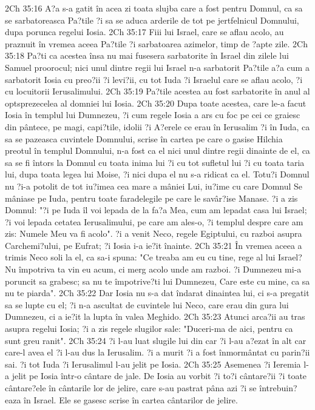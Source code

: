 2Ch 35:16  A?a s-a gatit în acea zi toata slujba care a fost pentru Domnul, ca sa se sarbatoreasca Pa?tile ?i sa se aduca arderile de tot pe jertfelnicul Domnului, dupa porunca regelui Iosia.
2Ch 35:17  Fiii lui Israel, care se aflau acolo, au praznuit în vremea aceea Pa?tile ?i sarbatoarea azimelor, timp de ?apte zile.
2Ch 35:18  Pa?ti ca acestea însa nu mai fusesera sarbatorite în Israel din zilele lui Samuel proorocul; nici unul dintre regii lui Israel n-a sarbatorit Pa?tile a?a cum a sarbatorit Iosia cu preo?ii ?i levi?ii, cu tot Iuda ?i Israelul care se aflau acolo, ?i cu locuitorii Ierusalimului.
2Ch 35:19  Pa?tile acestea au fost sarbatorite în anul al optsprezecelea al domniei lui Iosia.
2Ch 35:20  Dupa toate acestea, care le-a facut Iosia în templul lui Dumnezeu, ?i cum regele Iosia a ars cu foc pe cei ce graiesc din pântece, pe magi, capi?tile, idolii ?i A?erele ce erau în Ierusalim ?i în Iuda, ca sa se pazeasca cuvintele Domnului, scrise în cartea pe care o gasise Hilchia preotul în templul Domnului, n-a fost ca el nici unul dintre regii dinainte de el, ca sa se fi întors la Domnul cu toata inima lui ?i cu tot sufletul lui ?i cu toata taria lui, dupa toata legea lui Moise, ?i nici dupa el nu s-a ridicat ca el. Totu?i Domnul nu ?i-a potolit de tot iu?imea cea mare a mâniei Lui, iu?ime cu care Domnul Se mâniase pe Iuda, pentru toate faradelegile pe care le savâr?ise Manase. ?i a zis Domnul: "?i pe Iuda îl voi lepada de la fa?a Mea, cum am lepadat casa lui Israel; ?i voi lepada cetatea Ierusalimului, pe care am ales-o, ?i templul despre care am zis: Numele Meu va fi acolo". ?i a venit Neco, regele Egiptului, cu razboi asupra Carchemi?ului, pe Eufrat; ?i Iosia i-a ie?it înainte.
2Ch 35:21  În vremea aceea a trimis Neco soli la el, ca sa-i spuna: "Ce treaba am eu cu tine, rege al lui Israel? Nu împotriva ta vin eu acum, ci merg acolo unde am razboi. ?i Dumnezeu mi-a poruncit sa grabesc; sa nu te împotrive?ti lui Dumnezeu, Care este cu mine, ca sa nu te piarda".
2Ch 35:22  Dar Iosia nu s-a dat îndarat dinaintea lui, ci s-a pregatit sa se lupte cu el; ?i n-a ascultat de cuvintele lui Neco, care erau din gura lui Dumnezeu, ci a ie?it la lupta în valea Meghido.
2Ch 35:23  Atunci arca?ii au tras asupra regelui Iosia; ?i a zis regele slugilor sale: "Duceri-ma de aici, pentru ca sunt greu ranit".
2Ch 35:24  ?i l-au luat slugile lui din car ?i l-au a?ezat în alt car care-l avea el ?i l-au dus la Ierusalim. ?i a murit ?i a fost înmormântat cu parin?ii sai. ?i tot Iuda ?i Ierusalimul l-au jelit pe Iosia.
2Ch 35:25  Asemenea ?i Ieremia l-a jelit pe Iosia într-o cântare de jale. De Iosia au vorbit ?i to?i cântare?ii ?i toate cântare?ele în cântarile lor de jelire, care s-au pastrat pâna azi ?i se întrebuin?eaza în Israel. Ele se gasesc scrise în cartea cântarilor de jelire.
